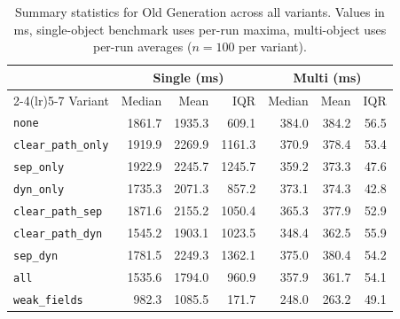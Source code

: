 \begin{table}[t]
\centering
\small
\caption{Summary statistics for Old Generation across all variants. Values in ms, single-object benchmark uses per-run maxima, multi-object uses per-run averages ($n=100$ per variant).}
\label{tab:stats-oldgen}
\begin{tabular}{l rrr rrr}
\toprule
 & \multicolumn{3}{c}{Single (ms)} & \multicolumn{3}{c}{Multi (ms)} \\
\cmidrule(lr){2-4}\cmidrule(lr){5-7}
Variant & Median & Mean & IQR & Median & Mean & IQR \\
\midrule
\texttt{none} & 1861.7 & 1935.3 & 609.1 & 384.0 & 384.2 & 56.5 \\
\texttt{clear\_path\_only} & 1919.9 & 2269.9 & 1161.3 & 370.9 & 378.4 & 53.4 \\
\texttt{sep\_only} & 1922.9 & 2245.7 & 1245.7 & 359.2 & 373.3 & 47.6 \\
\texttt{dyn\_only} & 1735.3 & 2071.3 & 857.2 & 373.1 & 374.3 & 42.8 \\
\texttt{clear\_path\_sep} & 1871.6 & 2155.2 & 1050.4 & 365.3 & 377.9 & 52.9 \\
\texttt{clear\_path\_dyn} & 1545.2 & 1903.1 & 1023.5 & 348.4 & 362.5 & 55.9 \\
\texttt{sep\_dyn} & 1781.5 & 2249.3 & 1362.1 & 375.0 & 380.4 & 54.2 \\
\texttt{all} & 1535.6 & 1794.0 & 960.9 & 357.9 & 361.7 & 54.1 \\
\texttt{weak\_fields} & 982.3 & 1085.5 & 171.7 & 248.0 & 263.2 & 49.1 \\
\bottomrule
\end{tabular}
\end{table}
